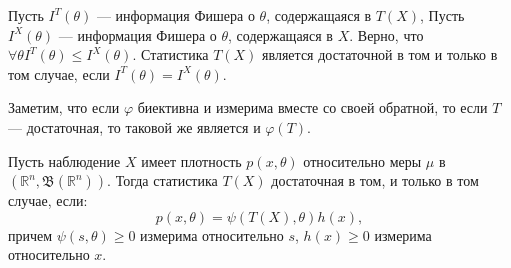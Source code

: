 \documentclass[12pt, russian]{article}
\begin{document}
Пусть $I^T(\theta)$ --- информация Фишера о $\theta$, содержащаяся в $T(X)$, Пусть $I^X(\theta)$ --- информация Фишера о $\theta$, содержащаяся в $X$. Верно, что $\forall \theta I^T(\theta) \leq I^X(\theta)$. Статистика $T(X)$ является достаточной в том и только в том случае, если $I^T(\theta) = I^X(\theta)$.

Заметим, что если $\varphi$ биективна и измерима вместе со своей обратной, то если $T$ --- достаточная, то таковой же является и $\varphi(T)$.

\begin{theorem}
Пусть наблюдение $X$ имеет плотность $p(x, \theta)$ относительно меры $\mu$ в $(\mathbb{R}^n, \mathfrak{B}(\mathbb{R}^n))$. Тогда статистика $T(X)$ достаточная в том, и только в том случае, если:
$$ p(x, \theta) = \psi(T(X), \theta)h(x), $$
причем $\psi(s, \theta)\geq 0$ измерима относительно $s$, $h(x)\geq 0$ измерима относительно $x$.
\end{theorem}
\end{document}
